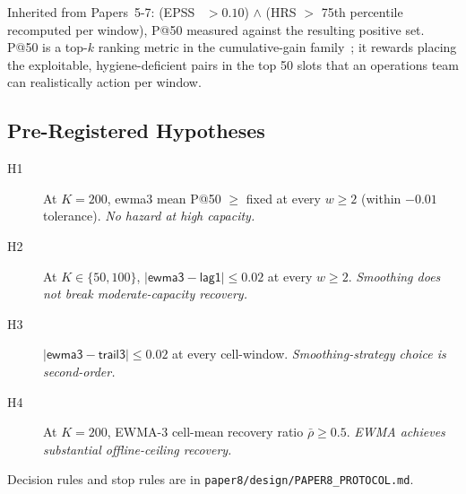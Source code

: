 Inherited from Papers~5-7: (EPSS~\cite{jacobs2021epss} $> 0.10$)
$\wedge$ (HRS $>$ 75th percentile recomputed per window), P@50
measured against the resulting positive set. P@50 is a top-$k$
ranking metric in the cumulative-gain family~\cite{jarvelin2002cumulated};
it rewards placing the exploitable, hygiene-deficient pairs in the
top 50 slots that an operations team can realistically action per
window.

\subsection{Pre-Registered Hypotheses}

\begin{description}
\item[H1] At $K = 200$, \textsf{ewma3} mean P@50 $\geq$ \textsf{fixed}
at every $w \geq 2$ (within $-0.01$ tolerance). \textit{No hazard at
high capacity.}
\item[H2] At $K \in \{50, 100\}$, $|\textsf{ewma3} - \textsf{lag1}|
\leq 0.02$ at every $w \geq 2$. \textit{Smoothing does not break
moderate-capacity recovery.}
\item[H3] $|\textsf{ewma3} - \textsf{trail3}| \leq 0.02$ at every
cell-window. \textit{Smoothing-strategy choice is second-order.}
\item[H4] At $K = 200$, EWMA-3 cell-mean recovery ratio $\bar\rho
\geq 0.5$. \textit{EWMA achieves substantial offline-ceiling recovery.}
\end{description}

Decision rules and stop rules are in \texttt{paper8/design/PAPER8\_PROTOCOL.md}.

